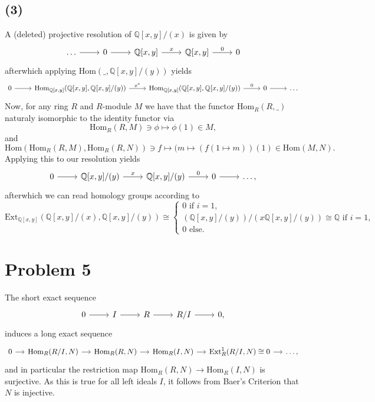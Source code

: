 \documentclass{article}
\theoremstyle{definition}
\newcommand{\Q}{\mathbb{Q}}
\newcommand{\Hom}{\text{Hom}}
\newcommand{\Ext}{\text{Ext}}
\begin{document}
\subsection*{(3)}

A (deleted) projective resolution of $\Q[x, y]/(x)$ is given by
\[
\begin{tikzcd}
	\ldots
	\ar{r}
	& 0
	\ar{r}
	& \Q[x, y]
	\ar{r}{x}
	& \Q[x, y]
	\ar{r}{0}
	& 0
\end{tikzcd}
\] 
afterwhich applying $\Hom(\_, \Q[x, y]/(y))$ yields
\[
\begin{tikzcd}
	0
	\ar{r}
	& \Hom_{\Q[x, y]}(\Q[x, y], \Q[x, y]/(y))
	\ar{r}{x^{*}}
	& \Hom_{\Q[x, y]}(\Q[x, y], \Q[x, y]/(y))
	\ar{r}{0}
	& 0
	\ar{r}
	& \ldots
\end{tikzcd}
\]
Now, for any ring $R$ and $R$-module $M$ we have that the functor $\Hom_{R}(R, \_)$
naturaly isomorphic to the identity functor via
\[
	\Hom_{R}(R, M) \ni \phi \mapsto \phi(1) \in M,
\]
and
\[
	\Hom(\Hom_{R}(R, M), \Hom_{R}(R, N)) \ni f \mapsto (m \mapsto (f(1 \mapsto m))(1) \in \Hom(M, N).
\] 
Applying this to our resolution yields
\[
\begin{tikzcd}
	0
	\ar{r}
	& \Q[x, y]/(y)
	\ar{r}{x}
	& \Q[x, y]/(y)
	\ar{r}{0}
	& 0
	\ar{r}
	& \ldots,
\end{tikzcd}
\]
afterwhich we can read homology groups according to
\[
	\Ext_{\Q[x, y]}(\Q[x, y]/(x), \Q[x, y]/(y))
	\cong
	\begin{cases}
		0 \text{ if } i = 1, \\
		(\Q[x, y]/(y))/(x\Q[x, y]/(y)) \cong \Q \text{ if } i = 1, \\
		0 \text{ else.}
	\end{cases}
\] 

\section*{Problem 5}

The short exact sequence 
\[
\begin{tikzcd}
	0
	\ar{r}
	& I
	\ar{r}
	& R
	\ar{r}
	& R/I
	\ar{r}
	& 0,
\end{tikzcd}
\] 
induces a long exact sequence 
\[
\begin{tikzcd}[column sep = small]
	0
	\ar{r}
	& \Hom_{R}(R/I, N)
	\ar{r}
	& \Hom_{R}(R, N)
	\ar{r}
	& \Hom_{R}(I, N)
	\ar{r}
	& \Ext^{1}_{R}(R/I, N) \cong 0
	\ar{r}
	& \ldots,
\end{tikzcd}
\]	
and in particular the restriction map $\Hom_{R}(R, N) \to \Hom_{R}(I, N)$ is
surjective. As this is true for all left ideals $I$, it follows from Baer's
Criterion that $N$ is injective.
\end{document}
